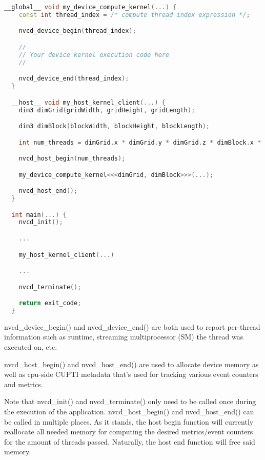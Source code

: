\documentclass[8pt, a4paper, twoside, twoclumn, english]{extreport}
\begin{document}
\begin{lstlisting}[language=C++, caption=Benchmark example]
  __global__ void my_device_compute_kernel(...) {
    const int thread_index = /* compute thread index expression */;

    nvcd_device_begin(thread_index);

    //
    // Your device kernel execution code here
    //

    nvcd_device_end(thread_index);
  }

  __host__ void my_host_kernel_client(...) {
    dim3 dimGrid(gridWidth, gridHeight, gridLength);

    dim3 dimBlock(blockWidth, blockHeight, blockLength);

    int num_threads = dimGrid.x * dimGrid.y * dimGrid.z * dimBlock.x * dimBlock.y * dimGrid.z;

    nvcd_host_begin(num_threads);

    my_device_compute_kernel<<<dimGrid, dimBlock>>>(...);

    nvcd_host_end();
  }

  int main(...) {
    nvcd_init();

    ...

    my_host_kernel_client(...)

    ...

    nvcd_terminate();

    return exit_code;
  }
\end{lstlisting}

\begin{flushleft}
nvcd\_device\_begin() and nvcd\_device\_end() are both used to report per-thread
information such as runtime, streaming multiprocessor (SM) the thread was
executed on, etc.
\end{flushleft}

\begin{flushleft}
nvcd\_host\_begin() and nvcd\_host\_end() are used to allocate device memory as well
as cpu-side CUPTI metadata that's used for tracking various event counters and metrics.
\end{flushleft}

\begin{flushleft}
Note that nvcd\_init() and nvcd\_terminate() only need to be called once during the execution of
the application. nvcd\_host\_begin() and nvcd\_host\_end() can be called in multiple places.
As it stands, the host begin function will currently reallocate all needed memory for computing
the desired metrics/event counters for the amount of threads passed. Naturally, the host end function
will free said memory.
\end{flushleft}
\end{document}
